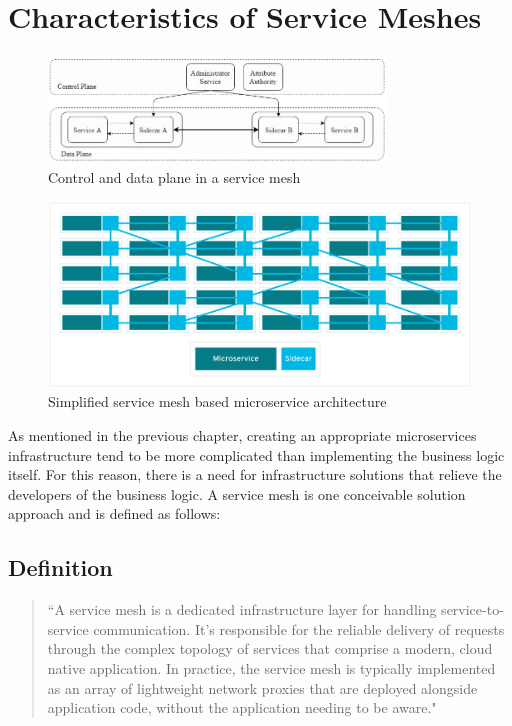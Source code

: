 \section{Characteristics of Service Meshes}

\begin{figure}
    \centering
    \includegraphics[width=0.8\textwidth]{img/mesh_detailed.JPG}
    \caption{Control and data plane in a service mesh\cite{sm4}}
    \label{fig:detailed mesh}
\end{figure}


\begin{figure}
    \includegraphics[width=\columnwidth]{img/mesh.png}
    \caption{Simplified service mesh based microservice architecture \cite{sm2}}
    \label{fig:overview}
\end{figure}

As mentioned in the previous chapter, creating an appropriate microservices infrastructure tend to be more complicated than implementing the business logic itself. For this reason, there is a need for infrastructure solutions that relieve the developers of the business logic. A service mesh is one conceivable solution approach and is defined as follows:

\subsection{Definition}

\begin{quote}
``A service mesh is a dedicated infrastructure layer for handling service-to-service communication. It’s responsible for the reliable delivery of requests through the complex topology of services that comprise a modern, cloud native application.
In practice, the service mesh is typically implemented as an array of lightweight network proxies that are deployed alongside application code, without the application needing to be aware." \cite[p. 123]{sm1}
\end{quote}

